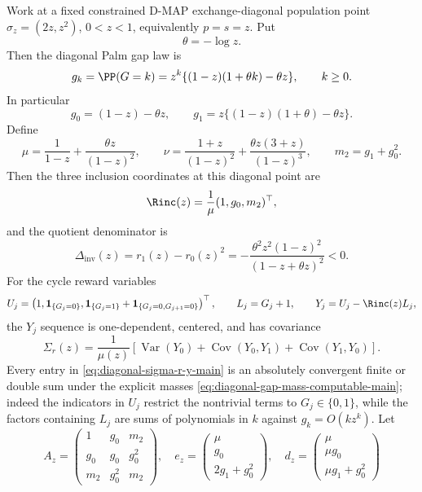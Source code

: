 \begin{proposition}\label{prop:computable-diagonal-covariance-main}
Work at a fixed constrained D-MAP exchange-diagonal population point
\(\sigma_z=(2z,z^2)\), \(0<z<1\), equivalently \(p=s=z\).  Put
\[
\theta=-\log z.
\]
Then the diagonal Palm gap law is
\begin{equation}\label{eq:diagonal-gap-mass-computable-main}
g_k=\PP(G=k)
=z^k\{(1-z)(1+\theta k)-\theta z\},\qquad k\ge0 .
\end{equation}
In particular
\[
g_0=(1-z)-\theta z,\qquad
g_1=z\{(1-z)(1+\theta)-\theta z\}.
\]
Define
\[
\mu=\frac1{1-z}+\frac{\theta z}{(1-z)^2},
\qquad
\nu=\frac{1+z}{(1-z)^2}
     +\frac{\theta z(3+z)}{(1-z)^3},
\qquad
m_2=g_1+g_0^2 .
\]
Then the three inclusion coordinates at this diagonal point are
\[
\Rinc(z)=\frac1\mu(1,g_0,m_2)^\top ,
\]
and the quotient denominator is
\[
\Delta_{\mathrm{inv}}(z)=r_1(z)-r_0(z)^2
=-\frac{\theta^2z^2(1-z)^2}{(1-z+\theta z)^2}<0 .
\]
For the cycle reward variables
\begin{equation}\label{eq:diagonal-cycle-reward-y-main}
U_j=\left(1,\mathbf1_{\{G_j=0\}},
\mathbf1_{\{G_j=1\}}+\mathbf1_{\{G_j=0,G_{j+1}=0\}}\right)^\top,
\qquad
L_j=G_j+1,\qquad
Y_j=U_j-\Rinc(z)L_j ,
\end{equation}
the \(Y_j\) sequence is one-dependent, centered, and has covariance
\begin{equation}\label{eq:diagonal-sigma-r-y-main}
\Sigma_r(z)=\frac1{\mu(z)}
\left[\operatorname{Var}(Y_0)+\operatorname{Cov}(Y_0,Y_1)
+\operatorname{Cov}(Y_1,Y_0)\right].
\end{equation}
Every entry in \eqref{eq:diagonal-sigma-r-y-main} is an absolutely convergent
finite or double sum under the explicit masses \eqref{eq:diagonal-gap-mass-computable-main};
indeed the indicators in \(U_j\) restrict the nontrivial terms to
\(G_j\in\{0,1\}\), while the factors containing \(L_j\) are sums of
polynomials in \(k\) against \(g_k=O(kz^k)\).
Let
\[
A_z=
\begin{pmatrix}
1&g_0&m_2\\
g_0&g_0&g_0^2\\
m_2&g_0^2&m_2
\end{pmatrix},
\quad
e_z=
\begin{pmatrix}
\mu\\ g_0\\ 2g_1+g_0^2
\end{pmatrix},
\quad
d_z=
\begin{pmatrix}
\mu\\ \mu g_0\\ \mu g_1+g_0^2

\end{pmatrix}\]
\end{proposition}
